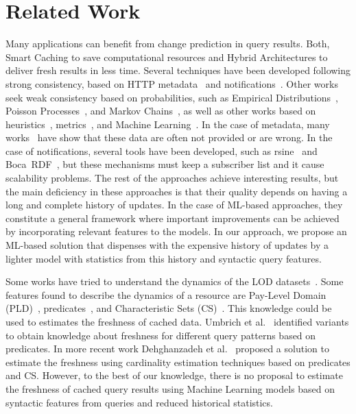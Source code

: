 \documentclass[runningheads]{llncs}
\begin{document}
%
\section{Related Work}
\label{sec:related}
%

Many applications can benefit from change prediction in query results. Both, Smart Caching to save computational resources and Hybrid Architectures to deliver fresh results in less time. Several techniques have been developed following strong consistency, based on HTTP metadata~\cite{fielding2rfc} and notifications~\cite{PassantM10,Fitzpatrick10,TrampFEA10}. Other works seek weak consistency based on probabilities, such as Empirical Distributions~\cite{NeumaierU16}, Poisson Processes~\cite{UmbrichHHPD10}, and Markov Chains~\cite{UmbrichMP15}, as well as other works based on heuristics~\cite{AliciAOCU12,UmbrichMP15,KnuthHS16}, metrics~\cite{DividinoGS15,KnuthHS16,AkhtarAL17}, and Machine Learning~\cite{NishiokaS17,GonzalezH18}. In the case of metadata, many works~\cite{UmbrichHHPD10,DividinoKG14,Kjernsmo15,NeumaierU16} have show that these data are often not provided or are wrong. In the case of notifications, several tools have been developed, such as rsine~\cite{MaderMS14} and Boca~RDF~\cite{MissierACDG07}, but these mechanisms must keep a subscriber list and it cause scalability problems. The rest of the approaches achieve interesting results, but the main deficiency in these approaches is that their quality depends on having a long and complete history of updates. In the case of ML-based approaches, they constitute a general framework where important improvements can be achieved by incorporating relevant features to the models. In our approach, we propose an ML-based solution that dispenses with the expensive history of updates by a lighter model with statistics from this history and syntactic query features.

Some works have tried to understand the dynamics of the LOD datasets~\cite{UmbrichHHPD10,UmbrichKL10,KaferAUOH13,DividinoSGG13,NishiokaS16}. Some features found to describe the dynamics of a resource are Pay-Level Domain (PLD)~\cite{NishiokaS16,NishiokaS17}, predicates~\cite{KaferAUOH13,NishiokaS17}, and Characteristic Sets (CS)~\cite{NishiokaS16,GonzalezH18}. This knowledge could be used to estimates the freshness of cached data. Umbrich et al.~\cite{UmbrichKHP12,UmbrichKPPH12,ekawUmbrichKHP12} identified variants to obtain knowledge about freshness for different query patterns based on predicates. In more recent work Dehghanzadeh et al.~\cite{DehghanzadehPKUHD14} proposed a solution to estimate the freshness using cardinality estimation techniques based on predicates and CS. However, to the best of our knowledge, there is no proposal to estimate the freshness of cached query results using Machine Learning models based on syntactic features from queries and reduced historical statistics.
\end{document}
